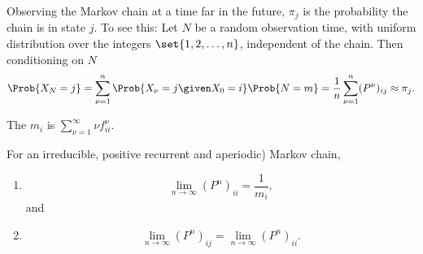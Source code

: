 \documentclass[12pt]{article}
\begin{document}
\begin{remark}
    Observing the Markov chain at a time far in the future, \( \pi_j \)
    is the probability the chain is in state \( j \).  To see this:  Let
    \( N \) be a random observation time, with uniform distribution over
    the integers \( \set{1, 2, \dots, n} \), independent of the chain.
    Then conditioning on \( N \)
    \[
        \Prob{X_N = j} = \sum\limits_{\nu=1}^n \Prob{X_{\nu} = j \given
        X_0 = i} \Prob{N = m} = \frac{1}{n} \sum\limits_{\nu=1}^n (P^{\nu})_
        {ij} \approx \pi_j.
    \]
\end{remark}

\begin{definition}
    The  \( m_i \) is \( \sum_{\nu=1}^\infty
    \nu f^\nu_{ii} \).
\end{definition}

\begin{theorem}
    For an irreducible, positive recurrent and aperiodic) Markov chain,
    \begin{enumerate}
        \item
            \[
                \lim_{n \to \infty} (P^{n})_{ii} = \frac{1}{m_i},
            \] and
        \item
            \[
                \lim_{n \to \infty} (P^{n})_{ij} = \lim_{n \to \infty} (P^
                {n})_{ii}.
            \]
    \end{enumerate}
\end{theorem}
\end{document}
